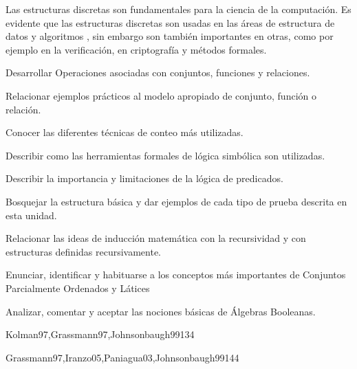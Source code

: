 \begin{syllabus}


\begin{justification}
Las estructuras discretas son fundamentales para la ciencia de la
computación. Es evidente que las estructuras discretas son usadas en
las áreas de estructura de datos y algoritmos , sin embargo son
también importantes en otras, como por ejemplo en la
verificación, en criptografía y métodos formales.
\end{justification}

\begin{goals}
\item Desarrollar Operaciones asociadas con conjuntos, funciones y relaciones.
\item Relacionar ejemplos prácticos al modelo apropiado de conjunto, función o relación.
\item Conocer las diferentes técnicas de conteo más utilizadas.
\item Describir como las herramientas formales de lógica simbólica son utilizadas.
\item Describir la importancia y limitaciones de la lógica de predicados.
\item Bosquejar la estructura básica y dar ejemplos de cada tipo de prueba descrita en esta unidad.
\item Relacionar las ideas de inducción matemática con la recursividad y con estructuras definidas recursivamente.
\item Enunciar, identificar y habituarse a los conceptos más importantes de Conjuntos Parcialmente Ordenados y Látices
\item Analizar, comentar y aceptar las nociones básicas de Álgebras Booleanas.
\end{goals}

\begin{outcomes}
\end{outcomes}

\begin{unit}{\DSFunctionsRelationsAndSetsDef}{Kolman97,Grassmann97,Johnsonbaugh99}{13}{4}
    \DSFunctionsRelationsAndSetsAllTopics
    \DSFunctionsRelationsAndSetsAllObjectives
\end{unit}

\begin{unit}{\DSBasicLogicDef}{Grassmann97,Iranzo05,Paniagua03,Johnsonbaugh99}{14}{4}
    \DSBasicLogicAllTopics
    \DSBasicLogicAllObjectives
\end{unit}


\end{syllabus}
